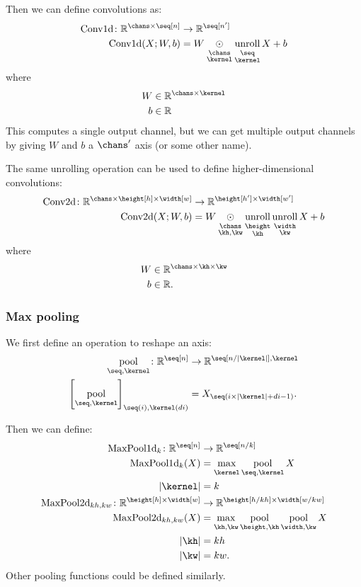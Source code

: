\documentclass{article}
\newcommand{\reals}{\mathbb{R}}
\begin{document}
Then we can define convolutions as:
\begin{align*}
\text{Conv1d} \colon \reals^{\chans \times \seq[n]} &\rightarrow \mathbb{R}^{\seq[n']} \\
\text{Conv1d}(X; W, b) &= W \ndot{\chans \\ \kernel} \nfun{\seq \\ \kernel}{unroll} X + b
\end{align*}
where
\begin{align*}
W &\in \reals^{\chans \times \kernel} \\
b &\in \reals \\
\end{align*}
This computes a single output channel, but we can get multiple output channels by giving $W$ and $b$ a $\chans'$ axis (or some other name).

The same unrolling operation can be used to define higher-dimensional convolutions:
\begin{align*}
  \text{Conv2d} \colon \reals^{\chans \times \height[h] \times \width[w]}
  &\rightarrow \reals^{\height[h'] \times \width[w']} \\
  \text{Conv2d}(X; W, b) &= W \ndot{\chans \\ \kh, \kw} \nfun{\height \\ \kh}{unroll} \nfun{\width\\\kw}{unroll} X + b
\end{align*}  
where
\begin{align*}
W &\in \reals^{\chans \times \kh \times \kw} \\
b &\in \reals.
\end{align*}

\subsubsection{Max pooling}

We first define an operation to reshape an axis:
\begin{align*}
\nfun{\seq,\kernel}{pool} \colon \reals^{\seq[n]} &\rightarrow \reals^{\seq[n/|\kernel|],\kernel} \\
\left[\nfun{\seq,\kernel}{pool}\right]_{\seq(i), \kernel(di)} &= X_{\seq(i \times |\kernel| + di - 1)}.
\end{align*}

Then we can define:
\begin{align*}
\text{MaxPool1d}_{k} \colon \mathbb{R}^{\seq[n]} &\rightarrow \mathbb{R}^{\seq[n/k]} \\
\text{MaxPool1d}_{k}(X) &= \nfun{\kernel}{max} \nfun{\seq,\kernel}{pool} X \\
|\kernel| &= k \\
\text{MaxPool2d}_{kh,kw} \colon \mathbb{R}^{\height[h] \times \width[w]} &\rightarrow \mathbb{R}^{\height[h/kh] \times \width[w/kw]} \\
\text{MaxPool2d}_{kh,kw}(X) &= \nfun{\kh,\kw}{max} \nfun{\height,\kh}{pool} \nfun{\width,\kw}{pool} X \\
|\kh| &= kh \\
|\kw| &= kw.
\end{align*}
Other pooling functions could be defined similarly.
\end{document}
